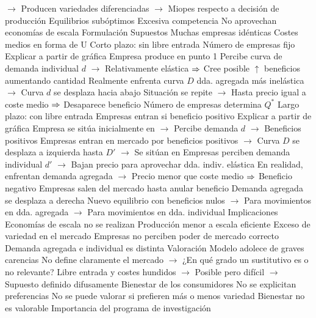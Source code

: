 \documentclass{nuevotema}
\begin{document}
\begin{esquemal}
				\4[] $\to$ Producen variedades diferenciadas
				\4[] $\to$ Miopes respecto a decisión de producción
				\4 Equilibrios subóptimos
				\4[] Excesiva competencia
				\4[] No aprovechan economías de escala
			\3 Formulación
				\4 Supuestos
				\4[] Muchas empresas idénticas
				\4[] Costes medios en forma de U
				\4 Corto plazo: sin libre entrada
				\4[] Número de empresas fijo
				\4[] Explicar a partir de gráfica
				\4[] 
				\4[] Empresa produce en punto 1
				\4[] Percibe curva de demanda individual $d$
				\4[] $\to$ Relativamente elástica
				\4[] $\Rightarrow$ Cree posible $\uparrow$ beneficios aumentando cantidad
				\4[] Realmente enfrenta curva $D$ dda. agregada más inelástica
				\4[] $\to$ Curva $d$ se desplaza hacia abajo
				\4[] Situación se repite
				\4[] $\to$ Hasta precio igual a coste medio
				\4[] $\Rightarrow$ Desaparece beneficio
				\4[] Número de empresas determina $Q^*$
				\4 Largo plazo: con libre entrada
				\4[] Empresas entran si beneficio positivo
				\4[] Explicar a partir de gráfica
				\4[] 
				\4[] Empresa se sitúa inicialmente en 
				\4[] $\to$ Percibe demanda $d$
				\4[] $\to$ Beneficios positivos
				\4[] Empresas entran en mercado por beneficios positivos
				\4[] $\to$ Curva $D$ se desplaza a izquierda hasta $D'$
				\4[] $\to$ Se sitúan en 
				\4[] Empresas perciben demanda individual $d'$
				\4[] $\to$ Bajan precio para aprovechar dda. indiv. elástica
				\4[] En realidad, enfrentan demanda agregada
				\4[] $\to$ Precio menor que coste medio
				\4[] $\Rightarrow$ Beneficio negativo
				\4[] Empresas salen del mercado hasta anular beneficio
				\4[] Demanda agregada se desplaza a derecha
				\4[] Nuevo equilibrio con beneficios nulos 
				\4[] $\to$ Para movimientos en dda. agregada
				\4[] $\to$ Para movimientos en dda. individual
			\3 Implicaciones
				\4 Economías de escala no se realizan
				\4[] Producción menor a escala eficiente
				\4[] Exceso de variedad en el mercado
				\4 Empresas no perciben poder de mercado correcto
				\4[] Demanda agregada e individual es distinta
			\3 Valoración
				\4 Modelo adolece de graves carencias
				\4[] No define claramente el mercado
				\4[] $\to$ ¿En qué grado un sustitutivo es o no relevante?
				\4[] Libre entrada y costes hundidos
				\4[] $\to$ Posible pero difícil
				\4[] $\to$ Supuesto definido difusamente
				\4 Bienestar de los consumidores
				\4[] No se explicitan preferencias
				\4[] No se puede valorar si prefieren más o menos variedad
				\4[] Bienestar no es valorable
				\4 Importancia del programa de investigación

\end{esquemal}
\end{document}
